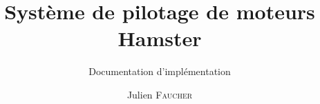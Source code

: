 \documentclass[a4paper,french]{report}
\author{Julien \textsc{Faucher}}
\title{Système de pilotage de moteurs Hamster}
\subtitle{Documentation d'implémentation}
\begin{document}
\makepagegarde
\tableofcontents 
\listoffigures




\end{document}
